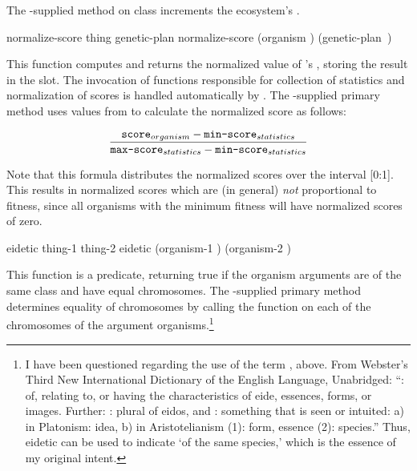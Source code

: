 {\filbreak
The \geco-supplied  method on class  increments the
ecosystem's .

\filbreak
{\samepage
{} normalize-score {thing genetic-plan}
	\label{method:normalize-score:organism}
 normalize-score {(organism )
                            \hbox{(genetic-plan )}}

This function computes and returns the normalized value of 's ,
storing the result in the  slot. The invocation of
functions responsible for collection of statistics and
normalization of scores is handled automatically by
\geco. The \geco-supplied primary method uses values from
 to
calculate the normalized score as follows:

$$\frac{   {\tt score}_{{\sl organism}}
         - {\tt min\mbox{{\tt -}}{}score}_{{\sl statistics}}
      }{   {\tt max\mbox{{\tt -}}{}score}_{{\sl statistics}}
         - {\tt min\mbox{{\tt -}}{}score}_{{\sl statistics}}}$$

}%

\filbreak

Note that this formula distributes the normalized scores over the interval
[0:1]. This results in normalized scores which are (in general) {\em
not} proportional to fitness, since all organisms with the minimum
fitness will have normalized scores of zero.

\gap

\filbreak
{\samepage
\Defgeneric eidetic {thing-1 thing-2}
 eidetic {(organism-1 ) (organism-2 )}

This function is a predicate, returning true if the organism arguments are 
of the same class and have equal chromosomes. The \geco-supplied primary method
determines equality of chromosomes by calling the function  on
each of the chromosomes of the argument organisms.\footnote{I have been questioned
regarding the use of the term , above. From Webster's Third New
International Dictionary of the English Language, Unabridged: ``: of,
relating to, or having the characteristics of eide, essences, forms, or images.
Further: : plural of eidos, and : something that is seen or
intuited: a) in Platonism: idea, b) in Aristotelianism (1): form, essence (2):
species.'' Thus, eidetic can be used to indicate `of the same species,' which is the
essence of my original intent.}
\par}%

}
